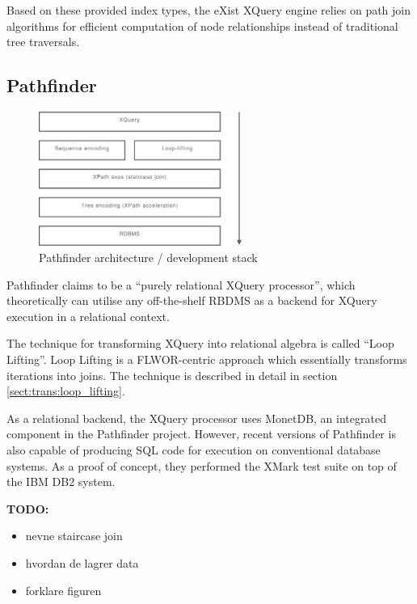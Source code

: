 Based on these provided index types, the eXist XQuery engine relies on path
join algorithms\cite{exist_idx_drv_query} for efficient computation of node
relationships instead of traditional tree traversals. 

\subsection{Pathfinder}
\label{sect:theory:pathfinder}
\begin{figure}[h]
  \centering
    \includegraphics[width=0.6\textwidth]{diagrams/pathfinder_arch}
  \caption{Pathfinder architecture / development stack}
\end{figure}
Pathfinder\cite{pathfinderHome} claims to be a ``purely relational XQuery
processor'', which theoretically can utilise any off-the-shelf RBDMS as a
backend for XQuery execution in a relational context.

The technique for transforming XQuery into relational algebra is called ``Loop
Lifting''\cite{pathfinder_mothertongue}. Loop Lifting is a FLWOR-centric
approach which essentially transforms iterations into joins. The technique is
described in detail in section \ref{sect:trans:loop_lifting}.

As a relational backend, the XQuery processor uses MonetDB, an integrated
component in the Pathfinder project. However, recent versions of Pathfinder is
also capable of producing SQL code for execution on conventional database
systems. As a proof of concept, they performed the XMark test suite on top of
the IBM DB2 system\cite{pathfinder_sql}.

\textbf{\Large TODO:}
\begin{itemize}
  \item nevne staircase join
  \item hvordan de lagrer data
  \item forklare figuren
\end{itemize}

